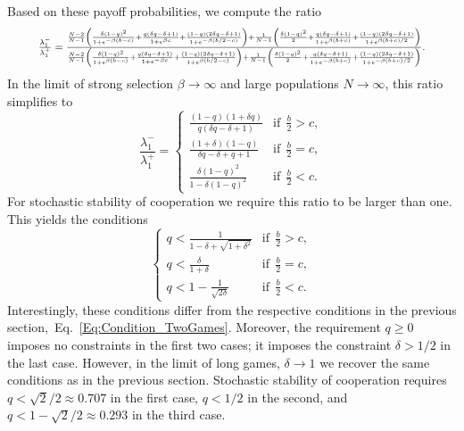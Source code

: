 \documentclass[11pt]{article}
\theoremstyle{plainCl1}
\theoremstyle{plainCl2}
\begin{document}
Based on these payoff probabilities, we compute the ratio
\begin{equation}
  \resizebox{.9\textwidth}{!}
  {%
  $\frac{\lambda^{-}_1}{\lambda^{+}_1} =
  \frac{\frac{N - 2}{N-1} \left(\frac{\delta \left(1 - q\right)^{2}}{1 + e^{- \beta \left(b - c\right)}} + \frac{q \left(\delta q - \delta + 1\right)}{1+e^{\beta c} } + \frac{\left(1 - q\right) \left(2 \delta q - \delta + 1\right)}{1 + e^{- \beta \left(b/2- c\right)}}\right) + \frac{1}{N-1} \left(\frac{\delta \left(1 - q\right)^{2}}{2} + \frac{q \left(\delta q - \delta + 1\right)}{1 + e^{ \beta \left( b + c\right)}} + \frac{\left(1 - q\right) \left(2 \delta q - \delta + 1\right)}{1 + e^{\beta (b+c)/2}}\right)}
  {\frac{N - 2}{N-1} \left(\frac{\delta \left(1 - q\right)^{2}}{1 + e^{ \beta \left(b - c\right)}} + \frac{q \left(\delta q - \delta + 1\right)}{1 + e^{- \beta c}} + \frac{\left(1 - q\right) \left(2 \delta q - \delta + 1\right)}{1 + e^{ \beta \left(b/2-c\right)}}\right) + \frac{1}{N-1}\left(\frac{\delta \left(1 - q\right)^{2}}{2} + \frac{q \left(\delta q - \delta + 1\right)}{1 + e^{- \beta \left(b + c\right)}} + \frac{\left(1 - q\right) \left(2 \delta q - \delta + 1\right)}{1 + e^{- \beta (b+c)/2}}\right)}.
  $}
\end{equation}
In the limit of strong selection \(\beta \rightarrow \infty\) and large
populations \(N \rightarrow \infty \), this ratio simplifies to
\begin{equation}
\frac{\lambda^{-}_1}{\lambda^{+}_1} = 
\begin{cases}
  \frac{(1-q) (1+\delta q)}{q \left(\delta q - \delta + 1\right)}  &\text{if}~~\frac{b}{2} > c , \\[0.2cm]
  \frac{\left(1+\delta \right) \left(1-q\right)} {\delta q - \delta + q + 1} &\text{if}~~ \frac{b}{2} = c , \\[0.2cm]
  \frac{\delta (1-q)^{2}}{1-\delta(1-q)^2 } &\text{if}~~ \frac{b}{2} < c .
\end{cases}
\end{equation}
For stochastic stability of cooperation we require this ratio to be larger than one. This yields the conditions
\begin{equation} \label{Eq:Condition_TwoRounds}
\begin{cases}
  q<\frac{1}{1-\delta+\sqrt{1+\delta^2}}  &\text{if}~~\frac{b}{2} > c , \\[0.1cm]
  q<\frac{\delta} {1+\delta} &\text{if}~~ \frac{b}{2} = c , \\[0.1cm]
  q<1-\frac{1}{\sqrt{2\delta}} &\text{if}~~ \frac{b}{2} < c .
\end{cases}
\end{equation}
Interestingly, these conditions differ from the respective conditions in the previous section,~Eq.~\eqref{Eq:Condition_TwoGames}.
Moreover, the requirement $q\ge 0$ imposes no constraints in the first two cases; it imposes the constraint $\delta\!>\!1/2$ in the last case. 
However, in the limit of long games, $\delta\!\rightarrow \!1$ we recover the same conditions as in the previous section. Stochastic stability of cooperation requires $q\!<\!\sqrt{2}/2\!\approx\! 0.707$ in the first case, $q\!<\!1/2$ in the second, and $q<1\!-\!\sqrt{2}/2\approx 0.293$ in the third case. 
\end{document}
